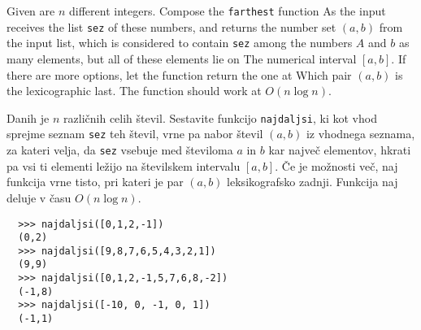 \documentclass[arhiv]{../izpit}
\begin{document}

Given are $ n $ different integers. Compose the \texttt {farthest}
function As the input receives the list \texttt {sez} of these numbers, and
returns the number set $ (a, b) $ from the input list, which is considered to
contain \texttt{sez} among the numbers $ A $ and $ b $ as many elements, but
all of these elements lie on The numerical interval $ [a, b] $. If there are
more options, let the function return the one at Which pair $ (a, b) $ is the
lexicographic last. The function should work at $ O (n \log n) $.

  Danih je $n$ različnih celih števil. Sestavite funkcijo \texttt{najdaljsi}, ki
  kot vhod sprejme seznam \texttt{sez} teh števil, vrne pa nabor števil $(a,b)$
  iz vhodnega seznama, za kateri velja, da \texttt{sez} vsebuje med številoma
  $a$ in $b$ kar največ elementov, hkrati pa vsi ti elementi ležijo na
  številskem intervalu $[a,b]$. Če je možnosti več, naj funkcija vrne tisto, pri
  kateri je par $(a,b)$ leksikografsko zadnji. Funkcija naj deluje v času $O(n
  \log n)$.

  \begin{verbatim}
  >>> najdaljsi([0,1,2,-1])
  (0,2)
  >>> najdaljsi([9,8,7,6,5,4,3,2,1])
  (9,9)
  >>> najdaljsi([0,1,2,-1,5,7,6,8,-2])
  (-1,8)
  >>> najdaljsi([-10, 0, -1, 0, 1])
  (-1,1)
  \end{verbatim}  
\end{document}
